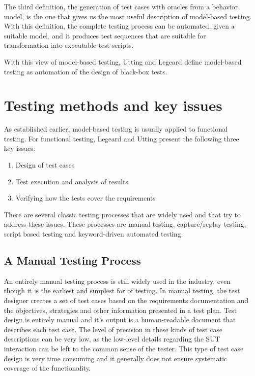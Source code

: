 The third definition, the generation of test cases with oracles from a behavior model, is the one that gives us the most useful description of model-based testing. With this definition, the complete testing process can be automated, given a suitable model, and it produces test sequences that are suitable for transformation into executable test scripts.

With this view of model-based testing, Utting and Legeard define model-based testing as automation of the design of black-box tests.

\section{Testing methods and key issues}
As established earlier, model-based testing is usually applied to functional testing. For functional testing, Legeard and Utting present the following three key issues:

\begin{enumerate}
	\item Design of test cases
	\item Test execution and analysis of results
	\item Verifying how the tests cover the requirements
\end{enumerate}

There are several classic testing processes that are widely used and that try to address these issues. These processes are manual testing, capture/replay testing, script based testing and keyword-driven automated testing.

\subsection{A Manual Testing Process}
An entirely manual testing process is still widely used in the industry, even though it is the earliest and simplest for of testing. In manual testing, the test designer creates a set of test cases based on the requirements documentation and the objectives, strategies and other information presented in a test plan. Test design is entirely manual and it's output is a human-readable document that describes each test case. The level of precision in these kinds of test case descriptions can be very low, as the low-level details regarding the SUT interaction can be left to the common sense of the tester. This type of test case design is very time consuming and it generally does not ensure systematic coverage of the functionality.

